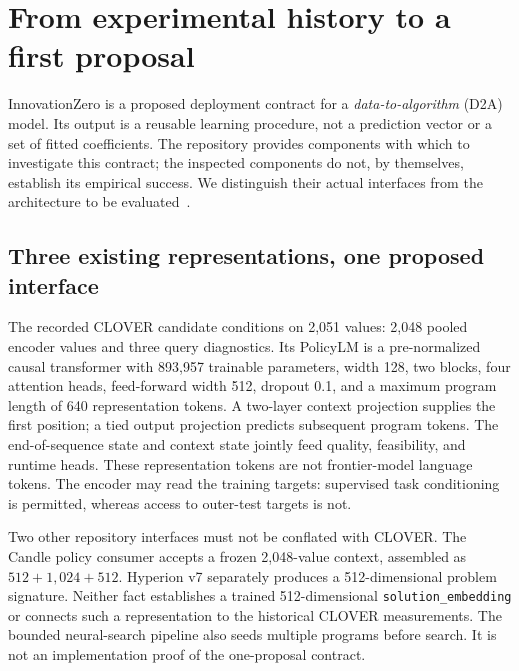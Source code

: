\section{From experimental history to a first proposal}
\label{sec:method}

InnovationZero is a proposed deployment contract for a \emph{data-to-algorithm}
(D2A) model. Its output is a reusable learning procedure, not a prediction vector
or a set of fitted coefficients. The repository provides components with which
to investigate this contract; the inspected components do not, by themselves,
establish its empirical success. We distinguish their actual interfaces from the
architecture to be evaluated~\citep{jope,clover}.

\subsection{Three existing representations, one proposed interface}

The recorded CLOVER candidate conditions on 2,051 values: 2,048 pooled encoder
values and three query diagnostics. Its PolicyLM is a pre-normalized causal
transformer with 893,957 trainable parameters, width 128, two blocks, four
attention heads, feed-forward width 512, dropout 0.1, and a maximum program
length of 640 representation tokens. A two-layer context projection supplies
the first position; a tied output projection predicts subsequent program tokens.
The end-of-sequence state and context state jointly feed quality, feasibility,
and runtime heads. These representation tokens are not frontier-model language
tokens. The encoder may read the training targets: supervised task conditioning
is permitted, whereas access to outer-test targets is not.

Two other repository interfaces must not be conflated with CLOVER. The Candle
policy consumer accepts a frozen 2,048-value context, assembled as
$512+1{,}024+512$. Hyperion v7 separately produces a 512-dimensional problem
signature. Neither fact establishes a trained 512-dimensional
\texttt{solution\_embedding} or connects such a representation to the historical
CLOVER measurements. The bounded neural-search pipeline also seeds multiple
programs before search. It is not an implementation proof of the one-proposal
contract.

